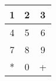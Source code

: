 \documentclass{article}
\begin{document}
\maketitle
\begin{table}[H]
\centering
\begin{tabular}{|c|c|c|}
\hline
1 & 2 & 3 \\ \hline
4 & 5 & 6 \\ \hline
7 & 8 & 9 \\ \hline
* & 0 & + \\ \hline
\end{tabular}
\end{table}
\end{document}
